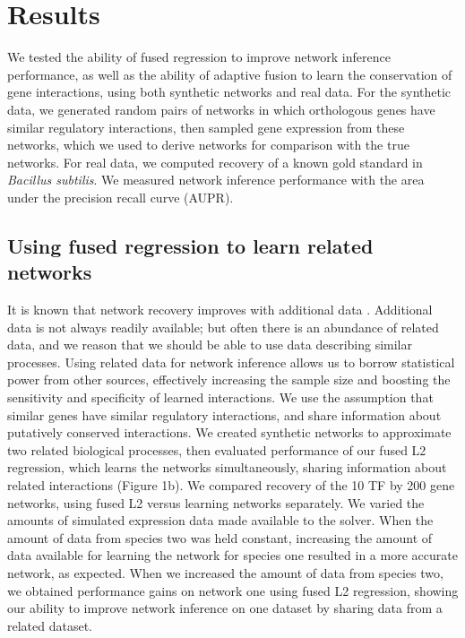 \documentclass[11pt]{article}
\begin{document}
\section{Results}
We tested the ability of fused regression to improve network inference performance, as well as the ability of adaptive fusion to learn the conservation of gene interactions, using both synthetic networks and real data. For the synthetic data, we generated random pairs of networks in which orthologous genes have similar regulatory interactions, then sampled gene expression from these networks, which we used to derive networks for comparison with the true networks. For real data, we computed recovery of a known gold standard in \textit{Bacillus subtilis}. We measured network inference performance with the area under the precision recall curve (AUPR). 

\subsection{Using fused regression to learn related networks}
It is known that network recovery improves with additional data \cite{bar-joseph_computational_2003}. Additional data is not always readily available; but often there is an abundance of related data, and we reason that we should be able to use data describing similar processes. Using related data for network inference allows us to borrow statistical power from other sources, effectively increasing the sample size and boosting the sensitivity and specificity of learned interactions. We use the assumption that similar genes have similar regulatory interactions, and share information about putatively conserved interactions. We created synthetic networks to approximate two related biological processes, then evaluated performance of our fused L2 regression, which learns the networks simultaneously, sharing information about related interactions (Figure 1b). We compared recovery of the 10 TF by 200 gene networks, using fused L2 versus learning networks separately. We varied the amounts of simulated expression data made available to the solver. When the amount of data from species two was held constant, increasing the amount of data available for learning the network for species one resulted in a more accurate network, as expected. When we increased the amount of data from species two, we obtained performance gains on network one using fused L2 regression, showing our ability to improve network inference on one dataset by sharing data from a related dataset. 
\end{document}
